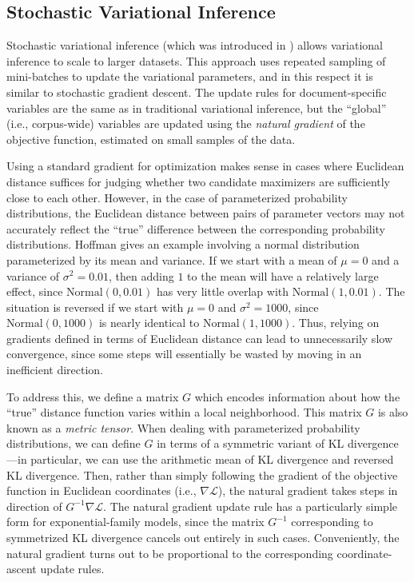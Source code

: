 \documentclass{article}
\begin{document}

\subsection{Stochastic Variational Inference}
\label{sec:svi}

Stochastic variational inference (which was introduced in \cite{hoffman2013stochastic}) allows variational inference to scale to larger datasets.
This approach uses repeated sampling of mini-batches to update the variational parameters, and in this respect it is similar to stochastic gradient descent.
The update rules for document-specific variables are the same as in traditional variational inference, but the ``global'' (i.e., corpus-wide) variables are updated using the \emph{natural gradient} of the objective function, estimated on small samples of the data.

Using a standard gradient for optimization makes sense in cases where Euclidean distance suffices for judging whether two candidate maximizers are sufficiently close to each other.
However, in the case of parameterized probability distributions, the Euclidean distance between pairs of parameter vectors may not accurately reflect the ``true'' difference between the corresponding probability distributions.
Hoffman \cite{hoffman2013stochastic} gives an example involving a normal distribution parameterized by its mean and variance.
If we start with a mean of $\mu = 0$ and a variance of $\sigma^2 = 0.01$, then adding $1$ to the mean will have a relatively large effect, since $\mathrm{Normal}(0, 0.01)$ has very little overlap with $\mathrm{Normal}(1, 0.01)$.
The situation is reversed if we start with $\mu = 0$ and $\sigma^2 = 1000$, since $\mathrm{Normal}(0, 1000)$ is nearly identical to $\mathrm{Normal}(1, 1000)$.
Thus, relying on gradients defined in terms of Euclidean distance can lead to unnecessarily slow convergence, since some steps will essentially be wasted by moving in an inefficient direction.

To address this, we define a matrix $G$ which encodes information about how the ``true'' distance function varies within a local neighborhood.
This matrix $G$ is also known as a \emph{metric tensor}.
When dealing with parameterized probability distributions, we can define $G$ in terms of a symmetric variant of KL divergence---in particular, we can use the arithmetic mean of KL divergence and reversed KL divergence.
Then, rather than simply following the gradient of the objective function in Euclidean coordinates (i.e., $\nabla \mathcal L$), the natural gradient takes steps in direction of $G^{-1} \nabla \mathcal L$.
The natural gradient update rule has a particularly simple form for exponential-family models, since the matrix $G^{-1}$ corresponding to symmetrized KL divergence cancels out entirely in such cases.
Conveniently, the natural gradient turns out to be proportional to the corresponding coordinate-ascent update rules.
\end{document}
